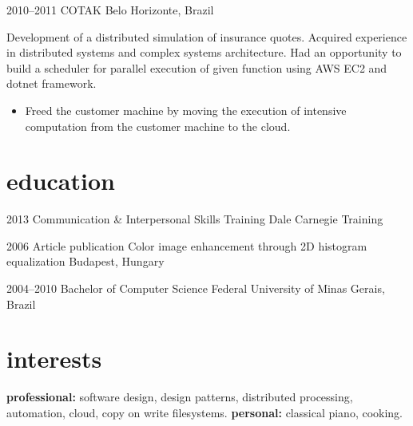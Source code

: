 \documentclass[]{friggeri-cv-a4}
\begin{document}
\begin{entrylist}
\entry
{2010--2011}
{COTAK}
{Belo Horizonte, Brazil}
{Development of a distributed simulation of insurance quotes. Acquired experience in distributed systems and complex systems architecture. 
Had an opportunity to build a scheduler for parallel execution of given function using AWS EC2 and dotnet framework.
\begin{itemize}
    \item Freed the customer machine by moving the execution of intensive computation from the customer machine to the cloud.
\end{itemize}
}


\end{entrylist}

\section{education}

\begin{entrylist}

\entry
{2013}
{Communication \& Interpersonal {\normalfont Skills Training}}
{Dale Carnegie Training}

\entry
{2006}
{Article publication {\normalfont Color image enhancement through 2D histogram equalization}}
{Budapest, Hungary}

\entry
{2004--2010}
{{\normalfont Bachelor of} Computer Science}
{Federal University of Minas Gerais, Brazil}


\end{entrylist}


\section{interests}

\textbf{professional:} software design, design patterns, distributed processing, automation, cloud, copy on write filesystems. \textbf{personal:} classical piano, cooking.
\end{document}
